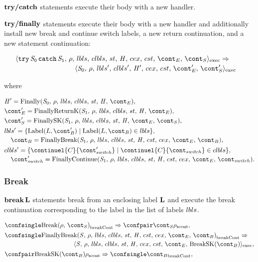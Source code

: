 \documentclass[a4paper,oneside]{article}
\newcommand{\synt}[1]{\ensuremath{\text{\textbf{#1}}}}
\DeclareMathOperator{\bbreak}{\synt{break}}
\newcommand{\cesktrans}[2]{\ensuremath{{#1} \Rightarrow {#2}}}
\newcommand{\cesktranssplit}[2]{\ensuremath{{#1} \Rightarrow\\ {#2}}}
\begin{document}
$\synt{try/catch}$ statements execute their body with a new handler.

$\synt{try/finally}$ statements execute their body with a new handler and additionally install new break and continue switch labels, a new return continuation, and a new statement continuation:

\begin{align*}
    &\begin{multlined}
        \cesktranssplit
            {\execconf{\TryFinally{\stmti{0}}{\stmti{1}}}{\env}{\lbls}{\clbls}{\strace}{\handler}{\cex,\,\cstrace}{\econt}{\scont}}%
            {\execconf{\stmti{0}}{\env}{\lbls'}{\clbls'}{\handler'}{\cex}{\cstrace}{\econt'}{\scont'}}
    \end{multlined}
\end{align*}

\noindent where

\begin{align*}
&\handler' = \FinallyK{\stmti{0}},\\
&\econt' = \FinallyReturnK{\stmti{1}},\\
&\scont' = \FinallySK{\stmti{1}},\\
&\begin{multlined}
    \lbls' = \lbrace \mathrm{Label}(L, \bcont') \mid \mathrm{Label}(L, \bcont) \in \lbls\rbrace,\\
    \bcont = \FinallyBreak{\stmti{1}}{\bcont},
\end{multlined}\\
&\begin{multlined}
    \clbls' =  \lbrace \continuel{C}{\switchcont'} \mid  \continuel{C}{\switchcont} \in \clbls\rbrace,\\
    \switchcont' = \FinallyContinue{\stmti{1}}{\switchcont}.
\end{multlined}
\end{align*}


\subsubsection{Break}

$\bbreak \synt{L}$ statements break from an enclosing label $\synt{L}$ and execute the break continuation corresponding to the label in the list of labels $lbls$.

\begin{align*}
    &\cesktrans%
        {\breakconf{\Break{\env}{\scont}}}%
        {\scontconf{\scont}{\env}},\\
    &\begin{multlined}
        \cesktranssplit%
            {\breakconf{\FinallyBreak{\stmt}{\bcont}}}%
            {\execconf{\stmt}{\env}{\lbls}{\clbls}{\strace}{\handler}{\cex,\,\cstrace}{\econt}{\mathrm{BreakSK}(\bcont)}},
    \end{multlined}\\
    &\cesktrans%
        {\scontconf{\mathrm{BreakSK}(\bcont)}{\env}}%
        {\breakconf{\bcont}},
\end{align*}
\end{document}
